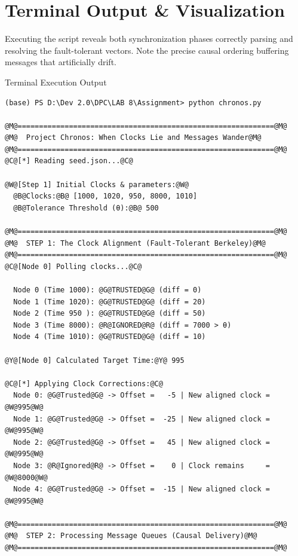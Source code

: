 \documentclass[11pt]{article}
\begin{document}
\section{Terminal Output \& Visualization}

Executing the script reveals both synchronization phases correctly parsing and resolving the fault-tolerant vectors. Note the precise causal ordering buffering messages that artificially drift.

\begin{terminalbox}{Terminal Execution Output}
\begin{lstlisting}[style=terminalstyle]
(base) PS D:\Dev 2.0\DPC\LAB 8\Assignment> python chronos.py

@M@============================================================@M@
@M@  Project Chronos: When Clocks Lie and Messages Wander@M@
@M@============================================================@M@
@C@[*] Reading seed.json...@C@

@W@[Step 1] Initial Clocks & parameters:@W@
  @B@Clocks:@B@ [1000, 1020, 950, 8000, 1010]
  @B@Tolerance Threshold (θ):@B@ 500

@M@============================================================@M@
@M@  STEP 1: The Clock Alignment (Fault-Tolerant Berkeley)@M@
@M@============================================================@M@
@C@[Node 0] Polling clocks...@C@

  Node 0 (Time 1000): @G@TRUSTED@G@ (diff = 0)
  Node 1 (Time 1020): @G@TRUSTED@G@ (diff = 20)
  Node 2 (Time 950 ): @G@TRUSTED@G@ (diff = 50)
  Node 3 (Time 8000): @R@IGNORED@R@ (diff = 7000 > θ)
  Node 4 (Time 1010): @G@TRUSTED@G@ (diff = 10)

@Y@[Node 0] Calculated Target Time:@Y@ 995

@C@[*] Applying Clock Corrections:@C@
  Node 0: @G@Trusted@G@ -> Offset =   -5 | New aligned clock = @W@995@W@
  Node 1: @G@Trusted@G@ -> Offset =  -25 | New aligned clock = @W@995@W@
  Node 2: @G@Trusted@G@ -> Offset =   45 | New aligned clock = @W@995@W@
  Node 3: @R@Ignored@R@ -> Offset =    0 | Clock remains     = @W@8000@W@
  Node 4: @G@Trusted@G@ -> Offset =  -15 | New aligned clock = @W@995@W@

@M@============================================================@M@
@M@  STEP 2: Processing Message Queues (Causal Delivery)@M@
@M@============================================================@M@


\end{lstlisting}
\end{terminalbox}
\end{document}
